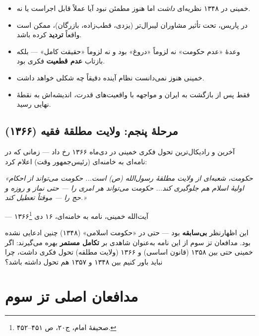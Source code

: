 \documentclass[12pt,a4paper]{book}
\newcommand{\keyword}[1]{\textbf{\textcolor{cPrimary}{#1}}}
\begin{document}
\begin{principleBox}
\begin{itemize}[label=\textcolor{cGold}{$\bullet$}, rightmargin=2em]
    \item خمینی در ۱۳۴۸ نظریه‌ای \textit{داشت} اما هنوز مطمئن نبود آیا عملاً قابل اجراست یا نه.
    \item در پاریس، تحت تأثیر مشاوران لیبرال‌تر (یزدی، قطب‌زاده، بازرگان)، ممکن است واقعاً \keyword{تردید} کرده باشد.
    \item وعدهٔ «عدم حکومت» نه لزوماً «دروغ» بود و نه لزوماً «حقیقت کامل» — بلکه بازتاب \keyword{عدم قطعیت} فکری بود.
    \item خمینی هنوز نمی‌دانست نظام آینده دقیقاً چه شکلی خواهد داشت.
    \item فقط پس از بازگشت به ایران و مواجهه با واقعیت‌های قدرت، اندیشه‌اش به نقطهٔ نهایی رسید.
\end{itemize}
\end{principleBox}

\subsection{مرحلهٔ پنجم: ولایت مطلقهٔ فقیه (۱۳۶۶)}

آخرین و رادیکال‌ترین تحول فکری خمینی در دی‌ماه ۱۳۶۶ رخ داد — زمانی که در نامه‌ای به خامنه‌ای (رئیس‌جمهور وقت) اعلام کرد:

\begin{warningBox}
\textit{«حکومت، شعبه‌ای از ولایت مطلقهٔ رسول‌الله (ص) است... حکومت می‌تواند از احکام اولیهٔ اسلام هم جلوگیری کند... حکومت می‌تواند هر امری را — حتی نماز و روزه و حج را — موقتاً تعطیل کند.»}

\hfill — آیت‌الله خمینی، نامه به خامنه‌ای، ۱۶ دی ۱۳۶۶\footnote{صحیفهٔ امام، ج۲۰، ص ۴۵۱–۴۵۲.}
\end{warningBox}

این اظهارنظر \keyword{بی‌سابقه} بود — حتی در «حکومت اسلامی» (۱۳۴۸) چنین ادعایی نشده بود. مدافعان تز سوم از این نامه به‌عنوان شاهدی بر \keyword{تکامل مستمر} بهره می‌گیرند: اگر خمینی حتی بین ۱۳۵۸ (قانون اساسی) و ۱۳۶۶ (ولایت مطلقه) تحول فکری داشت، چرا نباید باور کنیم بین ۱۳۴۸ و ۱۳۵۷ هم تحول داشته باشد؟

\section{مدافعان اصلی تز سوم}
\end{document}
